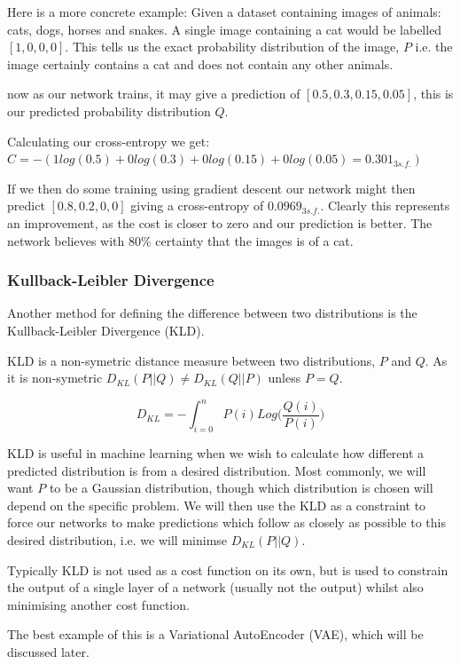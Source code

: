 Here is a more concrete example:
Given a dataset containing images of animals: cats, dogs, horses and snakes. A single image containing a cat would be labelled $[1, 0, 0, 0]$. This tells us the exact probability distribution of the image, $P$ i.e. the image certainly contains a cat and does not contain any other animals.

now as our network trains, it may give a prediction of $[0.5, 0.3, 0.15, 0.05]$, this is our predicted probability distribution $Q$.

Calculating our cross-entropy we get:
$C = -(1 log(0.5) + 0 log(0.3) + 0 log(0.15) + 0 log(0.05) = 0.301_{3s.f.})$


If we then do some training using gradient descent our network might then predict $[0.8, 0.2, 0, 0]$ giving a cross-entropy of $0.0969_{3s.f.}$. Clearly this represents an improvement, as the cost is closer to zero and our prediction is better. The network believes with 80\% certainty that the images is of a cat. 


\subsubsection{Kullback-Leibler Divergence}

Another method for defining the difference between two distributions is the Kullback-Leibler Divergence (KLD).

KLD is a non-symetric distance measure between two distributions, $P$ and $Q$. As it is non-symetric $D_{KL}(P||Q) \neq D_{KL}(Q||P)$ unless $P = Q$.

\begin{equation}
D_{KL} = -\int_{i=0}^{n}{P(i)Log(\frac{Q(i)}{P(i)}})
\label{eqn:kld}
\end{equation}

KLD is useful in machine learning when we wish to calculate how different a predicted distribution is from a desired distribution. Most commonly, we will want $P$ to be a Gaussian distribution, though which distribution is chosen will depend on the specific problem. We will then use the KLD as a constraint to force our networks to make predictions which follow as closely as possible to this desired distribution, i.e. we will minimse $D_{KL}(P||Q)$.

Typically KLD is not used as a cost function on its own, but is used to constrain the output of a single layer of a network (usually not the output) whilst also minimising another cost function.

The best example of this is a Variational AutoEncoder (VAE), which will be discussed later.


